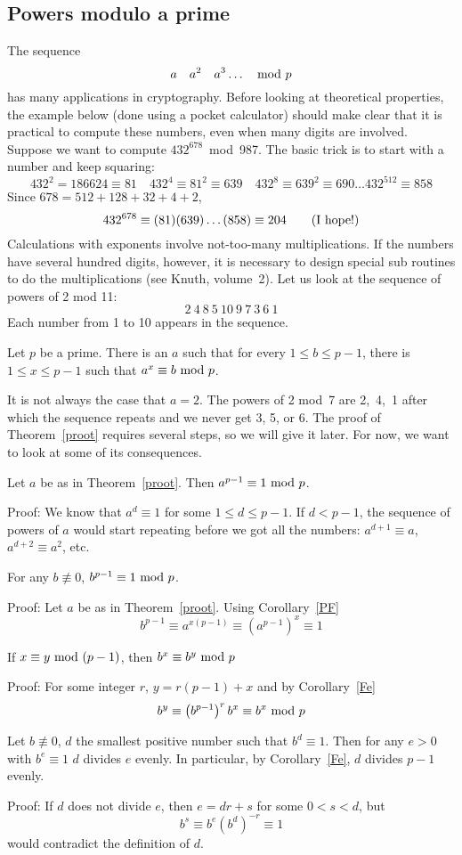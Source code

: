 \subsection{Powers modulo a prime}The sequence $$a\quad a^2\quad
a^3\dots\quad\hbox{mod }p$$ has many applications in cryptography.
Before looking at theoretical properties, the example below (done
using a pocket calculator) should make clear that it is practical
to compute these numbers, even when many digits are involved.
\pq Suppose we want to compute $432^{678}$~mod~987.  The basic trick
is to start with a number and keep squaring:
$$432^2=186624\equiv81\quad432^4\equiv81^2\equiv639\quad432^8\equiv
639^2\equiv690\dots432^{512}\equiv858$$
Since $678=512+128+32+4+2$, $$432^{678}\equiv(81)(639)\dots(858)
\equiv204\qquad\hbox{(I hope!)}$$Calculations with exponents 
involve not-too-many multiplications.  If the numbers have several
hundred digits, however, it is necessary to design special sub%
routines to do the multiplications (see Knuth, volume~2).
\pq Let us look at the sequence of powers of 2 mod 11:
$$2\ 4\ 8\ 5\ 10\ 9\ 7\ 3\ 6\ 1$$Each number from 1 to 10 appears
in the sequence.\begin{Th}\label{proot}Let $p$ be a prime.  There
is an $a$ such that for every $1\le b\le p-1$, there is $1\le x\le
p-1$ such that $a^x\equiv b\hbox{ mod }p$.\end{Th}
It is not always the case that $a=2$.  The powers of 2 mod~7 are
2,~4,~1 after which the sequence repeats and we never get 3, 5, or 6.
\pq The proof of Theorem~\ref{proot} requires several steps, so we
will give it later.  For now, we want to look at some of its consequences.
\begin{Co}Let $a$ be as in Theorem~\ref{proot}. Then $a^{p-1}\equiv1\hbox{ mod }p$.
\label{PF}\end{Co}Proof: We know that $a^d\equiv1$ for some $1\le d\le p-1$.  If
$d<p-1$, the sequence of powers of $a$ would start repeating before
we got all the numbers: $a^{d+1}\equiv a$, $a^{d+2}\equiv a^2$, etc.
\begin{Co}\label{Fe}For any $b\not\equiv0$,
 $b^{p-1}\equiv1\hbox{ mod }p$.\end{Co}Proof: Let $a$ be
as in Theorem~\ref{proot}. Using Corollary~\ref{PF} $$b^{p-1}
\equiv a^{x(p-1)}\equiv\left(a^{p-1}\right)^x\equiv1$$
\begin{Co}If $x\equiv y\hbox{ mod }(p-1)$, then $b^x\equiv b^y\hbox{ mod }p$\end{Co}
Proof: For some integer $r$, $y=r(p-1)+x$ and by Corollary~\ref{Fe}
$$b^y\equiv\left(b^{p-1}\right)^rb^x\equiv b^x\hbox{ mod }p$$
\begin{Le}\label{di}Let $b\not\equiv0$, $d$ the smallest
positive number such that $b^d\equiv1$.  Then for any $e>0$ with $b^e
\equiv 1$  $d$ divides $e$ evenly. In particular, by Corollary~\ref{Fe},
$d$ divides $p-1$ evenly.\end{Le}Proof: If $d$ does not divide $e$, then
$e=dr+s$ for some $0<s<d$, but $$b^s\equiv b^{e}\left(b^d\right)%
^{-r}\equiv1$$ would contradict the definition of $d$.
